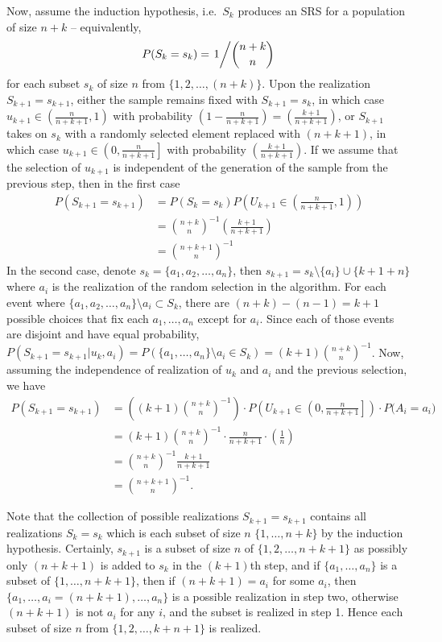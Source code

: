 \documentclass{homework}
\begin{document}
\begin{solution}
  Now, assume the induction hypothesis, i.e.~$S_k$ produces an SRS for a population of size $n+k$ -- equivalently,
  $$
   P(S_k = s_k) = \left. 1 \middle/ \binom{n+k}{n} \right.
  $$
  for each subset $s_k$ of size $n$ from $\{1,2,\dots,(n+k)\}$.
  Upon the realization $S_{k+1}=s_{k+1}$, either the sample remains fixed with $S_{k+1} = s_k$, in which case
   $u_{k+1} \in \left(\frac
  n{n+k+1},1\right)$ with probability $\left( 1 - \frac{n}{n+k+1}\right)=\left(
  \frac{k+1}{n+k+1} \right)$, or $S_{k+1}$ takes on $s_k$ with a randomly selected element replaced with
  $(n+k+1)$, in which case $u_{k+1} \in \left(0,\frac n{n+k+1}\right]$
  with probability $\left( \frac{k+1}{n+k+1} \right)$. If we assume that the
  selection of $u_{k+1}$ is independent of the generation of the sample from
  the previous step, then in the first case
  \begin{align*}
    P(S_{k+1} = s_{k+1}) 
    &= P(S_k = s_k) P\left(U_{k+1} \in \left(\frac n{n+k+1},1\right) \right) \\
    &=\binom {n+k}{n}^{-1} \left( \frac{k+1}{n+k+1} \right)\\
    &=\binom {n+k+1}n^{-1}
  \end{align*}
  In the second case, denote $s_k =\{a_1,a_2,\dots,a_n\}$, then $s_{k+1} =
  s_k\setminus\{a_i\}\cup\{k+1+n\}$ where $a_i$ is the realization of the
  random selection in the algorithm.  For each event where
  $\{a_1,a_2,\dots,a_n\}\setminus a_i \subset S_k$, there are $(n+k) - (n-1) = k+1$
  possible choices that fix each $a_1,\dots,a_n$ except for $a_i$.  Since each
  of those events are disjoint and have equal probability, $P(S_{k+1} = s_{k+1}
  | u_k,a_i) = P(\{a_1,\dots,a_n\}\setminus a_i \in S_k) = (k+1)\binom{n+k}n^{-1}$.  Now, assuming the independence
  of realization of $u_k$ and $a_i$ and the previous selection, we have
  \begin{align*}
    P(S_{k+1} = s_{k+1}) &= \left((k+1)\binom{n+k}n^{-1}\right)\cdot P\left(U_{k+1} \in \left(0,\frac n{n+k+1}\right] \right) \cdot P\Big( A_i = a_i \Big)\\
    &= (k+1)\binom{n+k}n^{-1}\cdot \frac n{n+k+1} \cdot \left( \frac 1n\right)\\
    &= \binom{n+k}{n}^{-1}\frac{k+1}{n+k+1}\\
    &=\binom {n+k+1}n^{-1}.
  \end{align*} 

  Note that the collection of possible realizations $S_{k+1} = s_{k+1}$ contains all realizations $S_k=s_k$ which is each subset of size $n$ $\{1,\dots,n+k\}$ by the induction hypothesis.  Certainly, $s_{k+1}$ is a subset of size $n$ of $\{1,2,\dots,n+k+1\}$ as possibly only $(n+k+1)$ is added to $s_k$ in the $(k+1)$th step, and if $\{a_1,\dots,a_n\}$ is a subset of $\{1,\dots,n+k+1\}$, then if $(n+k+1) = a_i$ for some $a_i$, then $\{a_1,\dots,a_i=(n+k+1),\dots,a_n\}$ is a possible realization in step two, otherwise $(n+k+1)$ is not $a_i$ for any $i$, and the subset is realized in step 1.  Hence each subset of size $n$ from $\{1,2,\dots,k+n+1\}$ is realized.
\end{solution}
\end{document}

